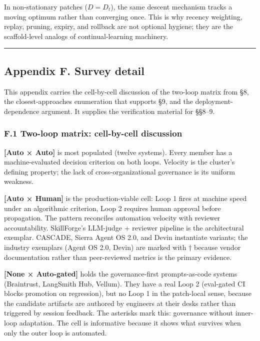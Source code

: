 \documentclass[
]{article}
\begin{document}
In non-stationary patches (\(D = D_t\)), the same descent mechanism
tracks a moving optimum rather than converging once. This is why recency
weighting, replay, pruning, expiry, and rollback are not optional
hygiene; they are the scaffold-level analogs of continual-learning
machinery.

\begin{center}\rule{0.5\linewidth}{0.5pt}\end{center}

\subsection{Appendix F. Survey detail}\label{appendix-f.-survey-detail}

This appendix carries the cell-by-cell discussion of the two-loop matrix
from §8, the closest-approaches enumeration that supports §9, and the
deployment-dependence argument. It supplies the verification material
for §§8--9.

\subsubsection{F.1 Two-loop matrix: cell-by-cell
discussion}\label{f.1-two-loop-matrix-cell-by-cell-discussion}

\textbf{{[}Auto × Auto{]}} is most populated (twelve systems). Every
member has a machine-evaluated decision criterion on both loops.
Velocity is the cluster's defining property; the lack of
cross-organizational governance is its uniform weakness.

\textbf{{[}Auto × Human{]}} is the production-viable cell: Loop 1 fires
at machine speed under an algorithmic criterion, Loop 2 requires human
approval before propagation. The pattern reconciles automation velocity
with reviewer accountability. SkillForge's LLM-judge + reviewer pipeline
is the architectural exemplar. CASCADE, Sierra Agent OS 2.0, and Devin
instantiate variants; the industry exemplars (Agent OS 2.0, Devin) are
marked with † because vendor documentation rather than peer-reviewed
metrics is the primary evidence.

\textbf{{[}None × Auto-gated{]}} holds the governance-first
prompts-as-code systems (Braintrust, LangSmith Hub, Vellum). They have a
real Loop 2 (eval-gated CI blocks promotion on regression), but no Loop
1 in the patch-local sense, because the candidate artifacts are authored
by engineers at their desks rather than triggered by session feedback.
The asterisks mark this: governance without inner-loop adaptation. The
cell is informative because it shows what survives when only the outer
loop is automated.
\end{document}
